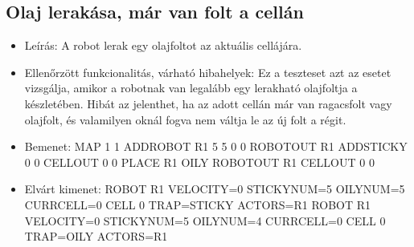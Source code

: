 \subsection{Olaj lerakása, már van folt a cellán}
\begin{itemize}
	\item Leírás: \newline
A robot lerak egy olajfoltot az aktuális cellájára.

	\item Ellenőrzött funkcionalitás, várható hibahelyek: \newline
Ez a teszteset azt az esetet vizsgálja, amikor a robotnak van legalább egy lerakható olajfoltja a készletében. Hibát az jelenthet, ha az adott cellán már van ragacsfolt vagy olajfolt, és valamilyen oknál fogva nem váltja le az új folt a régit.

	\item Bemenet: \newline
MAP 1 1 \newline
ADDROBOT R1 5 5 0 0	 \newline
ROBOTOUT R1 \newline
ADDSTICKY 0 0 \newline
CELLOUT 0 0 \newline
PLACE R1 OILY \newline
ROBOTOUT R1 \newline
CELLOUT 0 0

	\item Elvárt kimenet: \newline
ROBOT R1 VELOCITY=0 STICKYNUM=5 OILYNUM=5 CURRCELL=0 \newline
CELL 0 TRAP=STICKY ACTORS=R1 \newline 
ROBOT R1 VELOCITY=0 STICKYNUM=5 OILYNUM=4 CURRCELL=0 \newline
CELL 0 TRAP=OILY ACTORS=R1	

\end{itemize}


